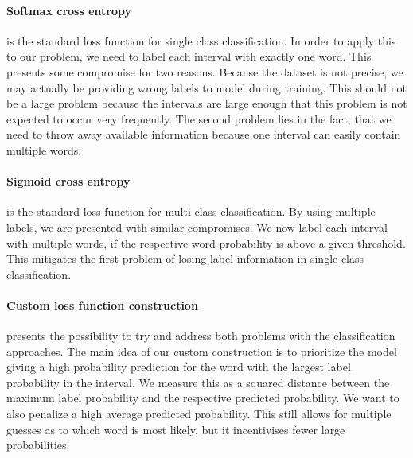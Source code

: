\paragraph{Softmax cross entropy} is the standard loss function for single class classification. In order to apply this to our problem, we need to label each interval with exactly one word. This presents some compromise for two reasons. Because the dataset is not precise, we may actually be providing wrong labels to model during training. This should not be a large problem because the intervals are large enough that this problem is not expected to occur very frequently. The second problem lies in the fact, that we need to throw away available information because one interval can easily contain multiple words.

\paragraph{Sigmoid cross entropy} is the standard loss function for multi class classification. By using multiple labels, we are presented with similar compromises. We now label each interval with multiple words, if the respective word probability is above a given threshold. This mitigates the first problem of losing label information in single class classification.

\paragraph{Custom loss function construction} presents the possibility to try and address both problems with the classification approaches. The main idea of our custom construction is to prioritize the model giving a high probability prediction for the word with the largest label probability in the interval. We measure this as a squared distance between the maximum label probability and the respective predicted probability. We want to also penalize a high average predicted probability. This still allows for multiple guesses as to which word is most likely, but it incentivises fewer large probabilities. 







